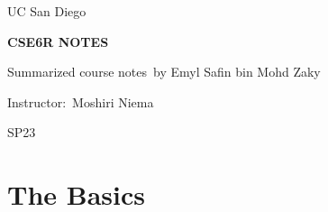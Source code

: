 \documentclass[13pt,a4paper,oneside]{book}
\begin{document}
\begin{titlepage}
\begin{center}
	\normalsize
	\begin{doublespace}
	\vspace*{0.5in}
	UC San Diego\
	
	\vspace{1in}
	
	\textbf{\MakeUppercase{CSE6R NOTES}}
	
	\vspace{1in}
	
	Summarized course notes\
	by Emyl Safin bin Mohd Zaky\
	
	
	
	\vspace{0.75in}
	
	
	\vspace{0.75in}
	\end{doublespace} 
	
	\begin{singlespace}
	Instructor:\ 
	Moshiri Niema\
	
	\vfill
	SP23    
	\end{singlespace} 
\end{center}
\end{titlepage}
\frontmatter
\tableofcontents
\clearpage
\mainmatter
{}
\lstset{
	style = mystyle
}
\lstset{
language = python
}
\lstset{
	inputpath = D:/Latex/Python/CSE6R/Notes/Code Listing
}
\chapter{The Basics}%
\label{cha:The Basics}
\end{document}
